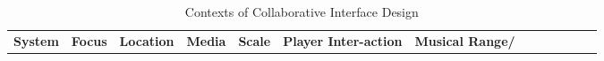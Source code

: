 \begin{center}

\begin{table}[ht]
\label{blaine-tab:1}
\caption{Contexts of Collaborative Interface Design}
\vspace{3pt} \noindent
\begin{tabular}{|p{41pt}|p{22pt}|p{22pt}|p{26pt}|p{17pt}|p{26pt}|p{31pt}|p{35pt}|p{33pt}|p{24pt}|p{35pt}|p{26pt}|p{36pt}|}
\hline
\parbox{41pt}{\centering 
\textbf{{\small System}}
} & \parbox{22pt}{\centering 
\textbf{{\small Focus}}
} & \parbox{22pt}{\centering 
\textbf{{\small Location}}
} & \parbox{26pt}{\centering 
\textbf{{\small Media}}
} & \parbox{17pt}{\centering 
\textbf{{\small Scale}}
} & \parbox{26pt}{\centering 
\textbf{{\small Player  Inter-action}}
} & \parbox{31pt}{\centering 
\textbf{{\small Musical Range/}}

}
\end{tabular}
\end{table}
\end{center}
